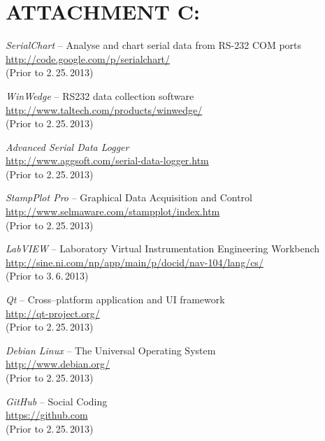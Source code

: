 \documentclass[12pt, a4paper, oneside]{article}
\newcommand{\It}{\textit}  %
\begin{document}
 \section*{ATTACHMENT C:}
 \begin{thebibliography}{99}

     \It{SerialChart} -- Analyse and chart serial data from RS-232 COM ports \\
    \url{http://code.google.com/p/serialchart/}\\
    (Prior to 2.\,25.\,2013)

     \It{WinWedge} -- RS232 data collection software \\
    \url{http://www.taltech.com/products/winwedge/}\\
    (Prior to 2.\,25.\,2013)

     \It{Advanced Serial Data Logger} \\
    \url{http://www.aggsoft.com/serial-data-logger.htm}\\
    (Prior to 2.\,25.\,2013)

     \It{StampPlot Pro} -- Graphical Data Acquisition and Control \\
    \url{http://www.selmaware.com/stampplot/index.htm}\\
    (Prior to 2.\,25.\,2013)

     \It{LabVIEW} -- Laboratory Virtual Instrumentation Engineering Workbench \\
    \url{http://sine.ni.com/np/app/main/p/docid/nav-104/lang/cs/}\\
    (Prior to 3.\,6.\,2013)

     \It{Qt} -- Cross--platform application and UI framework \\
    \url{http://qt-project.org/}\\
    (Prior to 2.\,25.\,2013)

     \It{Debian Linux} -- The Universal Operating System \\
    \url{http://www.debian.org/}\\
    (Prior to 2.\,25.\,2013)

     \It{GitHub} -- Social Coding \\
    \url{https://github.com}\\
    (Prior to 2.\,25.\,2013)


\end{thebibliography}
\end{document}
